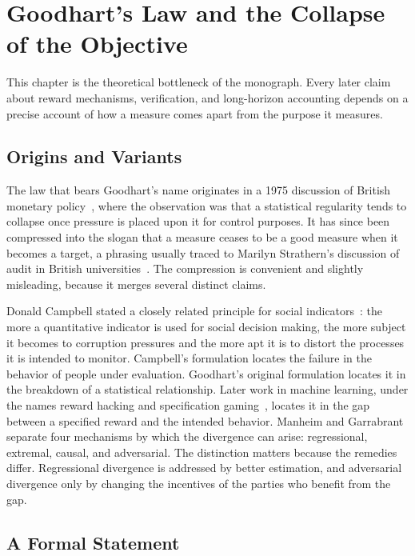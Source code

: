 \chapter{Goodhart's Law and the Collapse of the Objective}
\label{ch:goodhart}

This chapter is the theoretical bottleneck of the monograph. Every later claim about reward mechanisms, verification, and long-horizon accounting depends on a precise account of how a measure comes apart from the purpose it measures.

\section{Origins and Variants}

The law that bears Goodhart's name originates in a 1975 discussion of British monetary policy~\cite{goodhart1975}, where the observation was that a statistical regularity tends to collapse once pressure is placed upon it for control purposes. It has since been compressed into the slogan that a measure ceases to be a good measure when it becomes a target, a phrasing usually traced to Marilyn Strathern's discussion of audit in British universities~\cite{strathern1997}. The compression is convenient and slightly misleading, because it merges several distinct claims.

Donald Campbell stated a closely related principle for social indicators~\cite{campbell1979}: the more a quantitative indicator is used for social decision making, the more subject it becomes to corruption pressures and the more apt it is to distort the processes it is intended to monitor. Campbell's formulation locates the failure in the behavior of people under evaluation. Goodhart's original formulation locates it in the breakdown of a statistical relationship. Later work in machine learning, under the names reward hacking and specification gaming~\cite{skalse2022}, locates it in the gap between a specified reward and the intended behavior. Manheim and Garrabrant~\cite{manheim2018} separate four mechanisms by which the divergence can arise: regressional, extremal, causal, and adversarial. The distinction matters because the remedies differ. Regressional divergence is addressed by better estimation, and adversarial divergence only by changing the incentives of the parties who benefit from the gap.

\section{A Formal Statement}

